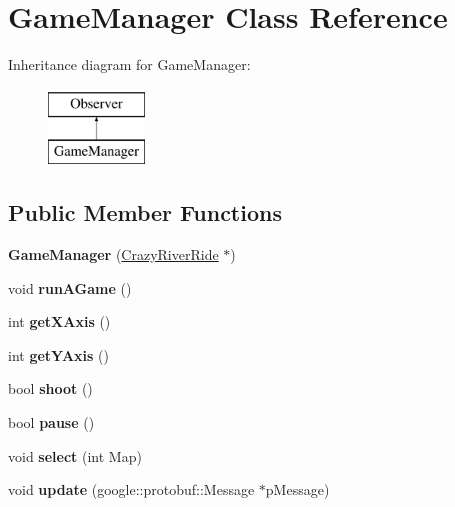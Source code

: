\hypertarget{class_game_manager}{\section{Game\-Manager Class Reference}
\label{class_game_manager}
}
Inheritance diagram for Game\-Manager\-:\begin{figure}[H]
\begin{center}
\leavevmode
\includegraphics[height=2.000000cm]{class_game_manager}
\end{center}
\end{figure}
\subsection*{Public Member Functions}
\begin{DoxyCompactItemize}
\item 
\hypertarget{class_game_manager_a8ca3e8bfd80b9c5637a279ba0a779859}{{\bfseries Game\-Manager} (\hyperlink{class_crazy_river_ride}{Crazy\-River\-Ride} $\ast$)}\label{class_game_manager_a8ca3e8bfd80b9c5637a279ba0a779859}

\item 
\hypertarget{class_game_manager_a46f13cda874d5146c65db959d44607c8}{void {\bfseries run\-A\-Game} ()}\label{class_game_manager_a46f13cda874d5146c65db959d44607c8}

\item 
\hypertarget{class_game_manager_a24ac94e016dc0ad440faa7b88ee31840}{int {\bfseries get\-X\-Axis} ()}\label{class_game_manager_a24ac94e016dc0ad440faa7b88ee31840}

\item 
\hypertarget{class_game_manager_abe4ae648e6067c8bd19a1d020c292560}{int {\bfseries get\-Y\-Axis} ()}\label{class_game_manager_abe4ae648e6067c8bd19a1d020c292560}

\item 
\hypertarget{class_game_manager_a6b43e9e166a906789e4b4aa134218994}{bool {\bfseries shoot} ()}\label{class_game_manager_a6b43e9e166a906789e4b4aa134218994}

\item 
\hypertarget{class_game_manager_a91a7e823176e56f32ca0b582592d7b02}{bool {\bfseries pause} ()}\label{class_game_manager_a91a7e823176e56f32ca0b582592d7b02}

\item 
\hypertarget{class_game_manager_a0c03dfd4e0fd50e0d9159da2b3d15342}{void {\bfseries select} (int Map)}\label{class_game_manager_a0c03dfd4e0fd50e0d9159da2b3d15342}

\item 
\hypertarget{class_game_manager_abcc7beda88f37957ab1c0711de030a45}{void {\bfseries update} (google\-::protobuf\-::\-Message $\ast$p\-Message)}\label{class_game_manager_abcc7beda88f37957ab1c0711de030a45}

\end{DoxyCompactItemize}


